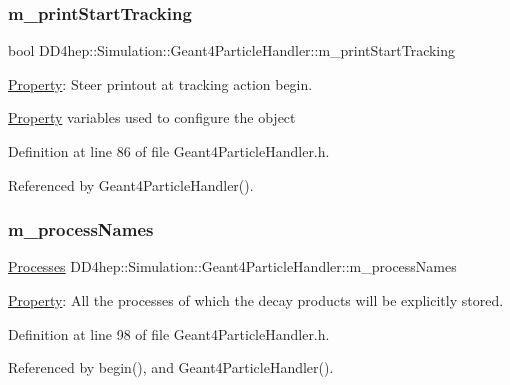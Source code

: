 \subsubsection{\texorpdfstring{m\+\_\+print\+Start\+Tracking}{m\_printStartTracking}}
{\footnotesize\ttfamily bool D\+D4hep\+::\+Simulation\+::\+Geant4\+Particle\+Handler\+::m\+\_\+print\+Start\+Tracking\hspace{0.3cm}{\ttfamily [protected]}}



\hyperlink{class_d_d4hep_1_1_property}{Property}\+: Steer printout at tracking action begin. 

\hyperlink{class_d_d4hep_1_1_property}{Property} variables used to configure the object 

Definition at line 86 of file Geant4\+Particle\+Handler.\+h.



Referenced by Geant4\+Particle\+Handler().

\hypertarget{class_d_d4hep_1_1_simulation_1_1_geant4_particle_handler_a86ffc05d00b981f7225c2cc6565e7739}{}\label{class_d_d4hep_1_1_simulation_1_1_geant4_particle_handler_a86ffc05d00b981f7225c2cc6565e7739} 
\subsubsection{\texorpdfstring{m\+\_\+process\+Names}{m\_processNames}}
{\footnotesize\ttfamily \hyperlink{class_d_d4hep_1_1_simulation_1_1_geant4_particle_handler_a80c1482fd25ec687f429854033ac3f79}{Processes} D\+D4hep\+::\+Simulation\+::\+Geant4\+Particle\+Handler\+::m\+\_\+process\+Names\hspace{0.3cm}{\ttfamily [protected]}}



\hyperlink{class_d_d4hep_1_1_property}{Property}\+: All the processes of which the decay products will be explicitly stored. 



Definition at line 98 of file Geant4\+Particle\+Handler.\+h.



Referenced by begin(), and Geant4\+Particle\+Handler().

